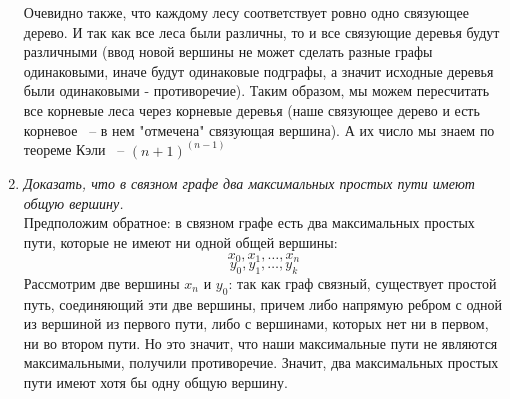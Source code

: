 \documentclass[10pt,a4paper]{article}
\begin{document}
\begin{enumerate}
	Очевидно также, что каждому лесу соответствует ровно одно связующее дерево. И так как все леса были различны, то и все связующие деревья будут различными (ввод новой вершины не может сделать разные графы одинаковыми, иначе будут одинаковые подграфы, а значит исходные деревья были одинаковыми - противоречие).
	Таким образом, мы можем пересчитать все корневые леса через корневые деревья (наше связующее дерево и есть корневое ~-- в нем "отмечена" связующая вершина). А их число мы знаем по теореме Кэли ~-- $(n+1)^{(n-1)}$
	\item \textit{Доказать, что в связном графе два максимальных простых пути имеют общую вершину.}\\
	Предположим обратное: в связном графе есть два максимальных простых пути, которые не имеют ни одной общей вершины:
	\[ x_0,x_1,\ldots,x_n \]
	\[ y_0,y_1,\ldots,y_k \]
	Рассмотрим две вершины $x_n$ и $y_0$: так как граф связный, существует простой путь, соединяющий эти две вершины, причем либо напрямую ребром с одной из вершиной из первого пути, либо с вершинами, которых нет ни в первом, ни во втором пути. Но это значит, что наши максимальные пути не являются максимальными, получили противоречие. Значит, два максимальных простых пути имеют хотя бы одну общую вершину.
\end{enumerate}
\end{document}

